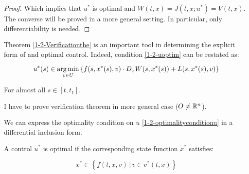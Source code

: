 \begin{theorem}
\begin{proof}
        Which implies that $u^{\ast}$ is optimal and $W(t,x)=J(t,x;u^{\ast})=V(t,x)$. 
        The converse will be proved in a more general setting. In particular, only differentiability is needed.

    \end{proof} 
\end{theorem}


Theorem \ref*{1-2-Verificationthe} is an important tool in determining the explicit form of and optimal control. 
Indeed, condition \ref*{1-2-uoptim} can be restated as:

\begin{equation}\label{1-2-optimalityconditionu}
        u^{\ast}(s) \in \operatorname*{arg\,min}_{v\in U} \left\{ f(s,x^{\ast}(s),v) \cdot D_xW(s,x^{\ast}(s)) + L(s,x^{\ast}(s),v)\right\}
\end{equation}

For almost all $s\in[t,t_1]$.

I have to prove verification theorem in more general case ($O\neq\mathbb{R}^n$).

We can express the optimality condition on $u$ \ref*{1-2-optimalityconditionu} in a differential inclusion form. 

\begin{corollary}
    A control $u^{\ast}$ is optimal if the corresponding state function $x^{\ast}$ satisfies:

    \begin{equation}
        x^{\ast} \in \left\{f(t,x,v) \,|\, v\in v^{\ast}(t,x)\right\}
    \end{equation}
\end{corollary}